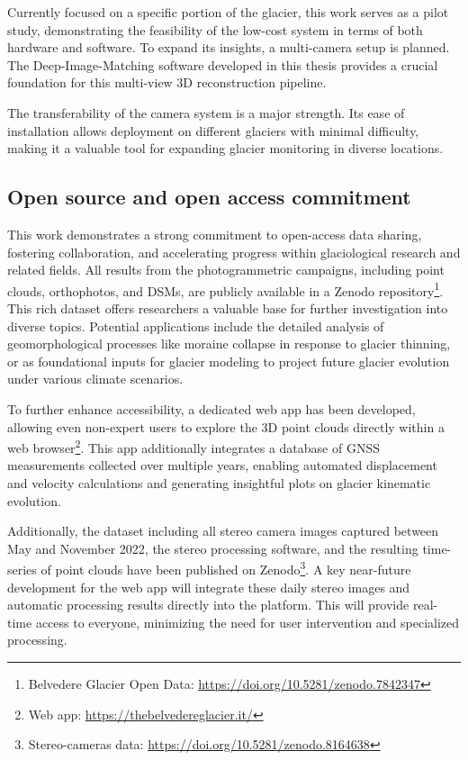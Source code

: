 Currently focused on a specific portion of the glacier, this work serves as a pilot study, demonstrating the feasibility of the low-cost system in terms of both hardware and software.
To expand its insights, a multi-camera setup is planned.
The Deep-Image-Matching software developed in this thesis provides a crucial foundation for this multi-view 3D reconstruction pipeline.

The transferability of the camera system is a major strength. 
Its ease of installation allows deployment on different glaciers with minimal difficulty, making it a valuable tool for expanding glacier monitoring in diverse locations.

\subsection*{Open source and open access commitment}

This work demonstrates a strong commitment to open-access data sharing, fostering collaboration, and accelerating progress within glaciological research and related fields.
All results from the photogrammetric campaigns, including point clouds, orthophotos, and DSMs, are publicly available in a Zenodo repository\footnote{Belvedere Glacier Open Data: \url{https://doi.org/10.5281/zenodo.7842347}}.
This rich dataset offers researchers a valuable base for further investigation into diverse topics. Potential applications include the detailed analysis of geomorphological processes like moraine collapse in response to glacier thinning, or as foundational inputs for glacier modeling to project future glacier evolution under various climate scenarios.

To further enhance accessibility, a dedicated web app has been developed, allowing even non-expert users to explore the 3D point clouds directly within a web browser\footnote{Web app: \url{https://thebelvedereglacier.it/}}.
This app additionally integrates a database of GNSS measurements collected over multiple years, enabling automated displacement and velocity calculations and generating insightful plots on glacier 
kinematic evolution.

Additionally, the dataset including all stereo camera images captured between May and November 2022, the stereo processing software, and the resulting time-series of point clouds have been published on Zenodo\footnote{Stereo-cameras data: \url{https://doi.org/10.5281/zenodo.8164638}}.
A key near-future development for the web app will integrate these daily stereo images and automatic processing results directly into the platform. 
This will provide real-time access to everyone, minimizing the need for user intervention and specialized processing.

